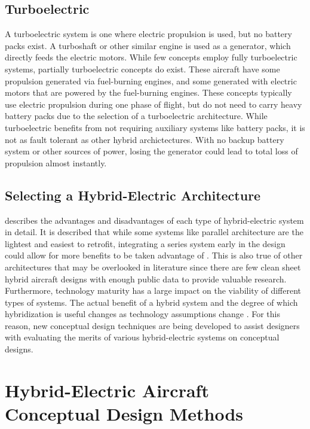 \documentclass[journal]{new-aiaa}
\begin{document}
\subsection{Turboelectric}
A turboelectric system is one where electric propulsion is used, but no battery packs exist. A turboshaft or other
similar engine is used as a generator, which directly feeds the electric motors. While few concepts employ fully
turboelectric systems, partially turboelectric concepts do exist. These aircraft have some propulsion generated via
fuel-burning engines, and some generated with electric motors that are powered by the fuel-burning engines. These
concepts typically use electric propulsion during one phase of flight, but do not need to carry heavy battery packs due
to the selection of a turboelectric architecture. While turboelectric benefits from not requiring auxiliary systems like
battery packs, it is not as fault tolerant as other hybrid archictectures. With no backup battery system or other
sources of power, losing the generator could lead to total loss of propulsion almost instantly.

\subsection{Selecting a Hybrid-Electric Architecture}
\citeauthor{zamboni2019} describes the advantages and disadvantages of each type of hybrid-electric system in detail. It
is described that while some systems like parallel architecture are the lightest and easiest to retrofit, integrating a
series system early in the design could allow for more benefits to be taken advantage of \cite{zamboni2019}. This is
also true of other architectures that may be overlooked in literature since there are few clean sheet hybrid aircraft
designs with enough public data to provide valuable research. Furthermore, technology maturity has a large impact on the
viability of different types of systems. The actual benefit of a hybrid system and the degree of which hybridization is
useful changes as technology assumptions change \cite{zamboni2019}. For this reason, new conceptual design techniques are
being developed to assist designers with evaluating the merits of various hybrid-electric systems on conceptual designs.

\section{Hybrid-Electric Aircraft Conceptual Design Methods}
\end{document}
